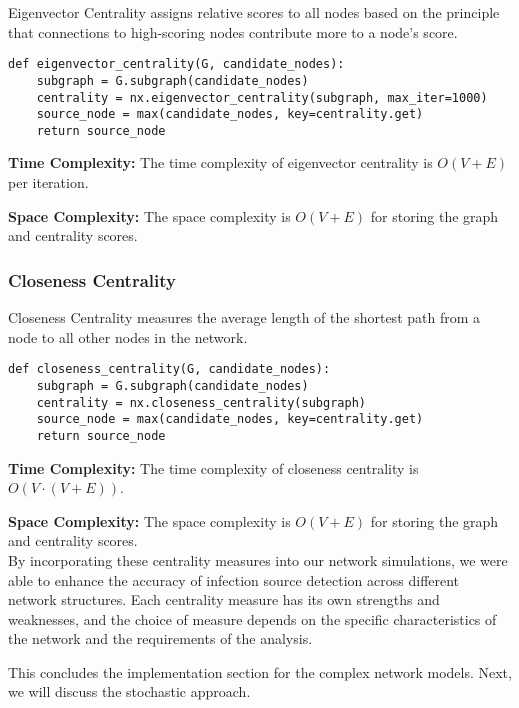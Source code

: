Eigenvector Centrality assigns relative scores to all nodes based on the principle that connections to high-scoring nodes contribute more to a node's score.

\begin{lstlisting}[caption=Eigenvector Centrality Algorithm, label=lst:eigenvector-centrality]
def eigenvector_centrality(G, candidate_nodes):
    subgraph = G.subgraph(candidate_nodes)
    centrality = nx.eigenvector_centrality(subgraph, max_iter=1000)
    source_node = max(candidate_nodes, key=centrality.get)
    return source_node
\end{lstlisting}

\textbf{Time Complexity:} The time complexity of eigenvector centrality is \(O(V + E)\) per iteration.

\textbf{Space Complexity:} The space complexity is \(O(V + E)\) for storing the graph and centrality scores.

\subsubsection{Closeness Centrality}

Closeness Centrality measures the average length of the shortest path from a node to all other nodes in the network.

\begin{lstlisting}[caption=Closeness Centrality Algorithm, label=lst:closeness-centrality]
def closeness_centrality(G, candidate_nodes):
    subgraph = G.subgraph(candidate_nodes)
    centrality = nx.closeness_centrality(subgraph)
    source_node = max(candidate_nodes, key=centrality.get)
    return source_node
\end{lstlisting}

\textbf{Time Complexity:} The time complexity of closeness centrality is \(O(V \cdot (V + E))\).

\textbf{Space Complexity:} The space complexity is \(O(V + E)\) for storing the graph and centrality scores.\\

By incorporating these centrality measures into our network simulations, we were able to enhance the accuracy of infection source detection across different network structures. Each centrality measure has its own strengths and weaknesses, and the choice of measure depends on the specific characteristics of the network and the requirements of the analysis.

This concludes the implementation section for the complex network models. Next, we will discuss the stochastic approach.

